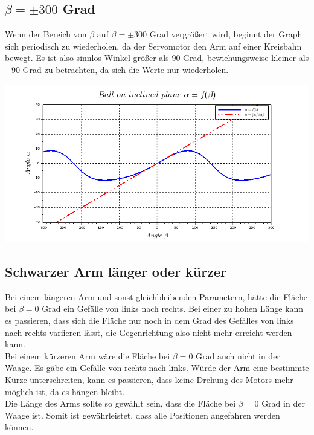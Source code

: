 \subsection{$\beta = \pm 300$ Grad}
Wenn der Bereich von $\beta$ auf $\beta=\pm300$ Grad vergrößert wird, beginnt der Graph sich periodisch zu wiederholen, da der Servomotor den Arm auf einer Kreisbahn bewegt. Es ist also sinnlos Winkel größer als $90$ Grad, bewiehungsweise kleiner als $-90$ Grad zu betrachten, da sich die Werte nur wiederholen. \\
\begin{center}
	\begin{minipage}{\linewidth}
	\centering
	\includegraphics[scale=0.45]{images/plot2_1.png}
	\end{minipage}

\end{center}

\subsection{Schwarzer Arm länger oder kürzer}
Bei einem längeren Arm und sonst gleichbleibenden Parametern, hätte die Fläche bei $\beta = 0$ Grad ein Gefälle von links nach rechts. Bei einer zu hohen Länge kann es passieren, dass sich die Fläche nur noch in dem Grad des Gefälles von links nach rechts variieren lässt, die Gegenrichtung also nicht mehr erreicht werden kann. \\
Bei einem kürzeren Arm wäre die Fläche bei $\beta = 0$ Grad auch nicht in der Waage. Es gäbe ein Gefälle von rechts nach links. Würde der Arm eine bestimmte Kürze unterschreiten, kann es passieren, dass keine Drehung des Motors mehr möglich ist, da es hängen bleibt. \\
Die Länge des Arms sollte so gewählt sein, dass die Fläche bei $\beta = 0$ Grad in der Waage ist. Somit ist gewährleistet, dass alle Positionen angefahren werden können.